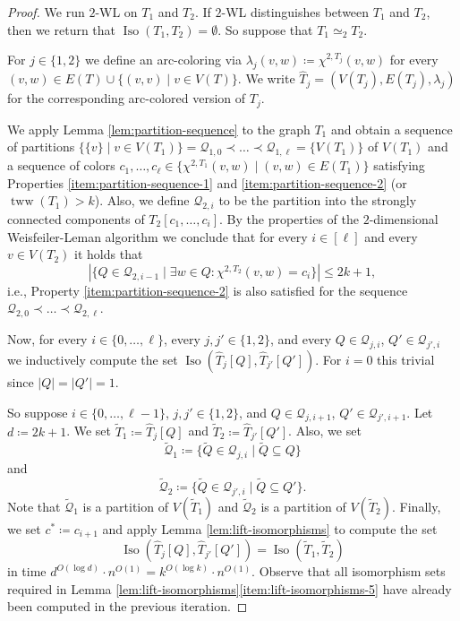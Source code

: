 \documentclass{theoretics}
\newcommand{\CQ}{{\mathcal Q}}
\newcommand{\WL}[2]{\chi^{#1,#2}}
\DeclareMathOperator{\Iso}{Iso}
\DeclareMathOperator{\tww}{tww}
\begin{document}
\begin{proof}
 We run $2$-WL on $T_1$ and $T_2$.
 If $2$-WL distinguishes between $T_1$ and $T_2$, then we return that $\Iso(T_1,T_2) = \emptyset$.
 So suppose that $T_1 \simeq_2 T_2$.

 For $j \in \{1,2\}$ we define an arc-coloring via $\lambda_j(v,w) \coloneqq \WL{2}{T_j}(v,w)$ for every $(v,w) \in E(T) \cup \{(v,v) \mid v \in V(T)\}$.
 We write $\widehat{T}_j = (V(T_j),E(T_j),\lambda_j)$ for the corresponding arc-colored version of $T_j$.

 We apply Lemma \ref{lem:partition-sequence} to the graph $T_1$ and obtain a sequence of partitions $\{\{v\} \mid v \in V(T_1)\} = \CQ_{1,0} \prec \dots \prec \CQ_{1,\ell} = \{V(T_1)\}$ of $V(T_1)$ and a sequence of colors $c_1,\dots,c_\ell \in \{\WL{2}{T_1}(v,w) \mid (v,w) \in E(T_1)\}$ satisfying Properties \ref{item:partition-sequence-1} and \ref{item:partition-sequence-2} (or $\tww(T_1) > k$).
 Also, we define $\CQ_{2,i}$ to be the partition into the strongly connected components of $T_2[c_1,\dots,c_i]$.
 By the properties of the $2$-dimensional Weisfeiler-Leman algorithm we conclude that for every $i \in [\ell]$ and every $v \in V(T_2)$ it holds that
 \[|\{Q \in \CQ_{2,i-1} \mid \exists w \in Q \colon \WL{2}{T_2}(v,w) = c_i\}| \leq 2k+1,\]
 i.e., Property \ref{item:partition-sequence-2} is also satisfied for the sequence $\CQ_{2,0} \prec \dots \prec \CQ_{2,\ell}$.

 Now, for every $i \in \{0,\dots,\ell\}$, every $j,j' \in \{1,2\}$, and every $Q \in \CQ_{j,i}$, $Q' \in \CQ_{j',i}$ we inductively compute the set $\Iso(\widehat{T}_j[Q],\widehat{T}_{j'}[Q'])$.
 For $i = 0$ this trivial since $|Q| = |Q'| = 1$.

 So suppose $i \in \{0,\dots,\ell-1\}$, $j,j' \in \{1,2\}$, and $Q \in \CQ_{j,i+1}$, $Q' \in \CQ_{j',i+1}$.
 Let $d \coloneqq 2k+1$.
 We set $\widetilde{T}_1 \coloneqq \widehat{T}_j[Q]$ and $\widetilde{T}_2 \coloneqq \widehat{T}_{j'}[Q']$.
 Also, we set
 \[\widetilde{\CQ}_1 \coloneqq \{\widetilde{Q} \in \CQ_{j,i} \mid \widetilde{Q} \subseteq Q\}\]
 and
 \[\widetilde{\CQ}_2 \coloneqq \{\widetilde{Q} \in \CQ_{j',i} \mid \widetilde{Q} \subseteq Q'\}.\]
 Note that $\widetilde{\CQ}_1$ is a partition of $V(\widetilde{T}_1)$ and $\widetilde{\CQ}_2$ is a partition of $V(\widetilde{T}_2)$.
 Finally, we set $c^* \coloneqq c_{i+1}$ and apply Lemma \ref{lem:lift-isomorphisms} to compute the set
 \[\Iso(\widehat{T}_j[Q],\widehat{T}_{j'}[Q']) = \Iso(\widetilde{T}_1,\widetilde{T}_2)\]
 in time $d^{O(\log d)} \cdot n^{O(1)} = k^{O(\log k)} \cdot n^{O(1)}$.
 Observe that all isomorphism sets required in Lemma \ref{lem:lift-isomorphisms}\ref{item:lift-isomorphisms-5} have already been computed in the previous iteration.


\end{proof}
\end{document}
